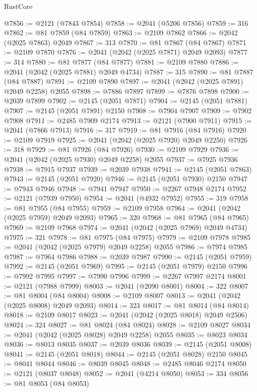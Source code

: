 \begin{lexlean}{RustCore}
\begin{coremodule}
@7856 := @2121 (@7843 @7854)
@7858 := @2041 (@5206 @7856)
@7859 := 316
@7862 := @81 @7859 (@84 @7859)
@7863 := @2109 @7862
@7866 := @2042 (@2025 @7863) @2049
@7867 := 313
@7870 := @81 @7867 (@84 @7867)
@7871 := @2109 @7870
@7876 := @2041 (@2042 (@2025 @7871) @2049 @2093)
@7877 := 314
@7880 := @81 @7877 (@84 @7877)
@7881 := @2109 @7880
@7886 := @2041 (@2042 (@2025 @7881) @2049 @4734)
@7887 := 315
@7890 := @81 @7887 (@84 @7887)
@7891 := @2109 @7890
@7897 := @2041 (@2042 (@2025 @7891) @2049 @2258) @2055
@7898 := @7886 @7897
@7899 := @7876 @7898
@7900 := @2039 @7899
@7902 := @2145 (@2051 @7871)
@7904 := @2145 (@2051 @7881)
@7907 := @2145 (@2051 @7891) @2150
@7908 := @7904 @7907
@7909 := @7902 @7908
@7911 := @2485 @7909 @2174
@7913 := @2121 (@7900 @7911)
@7915 := @2041 (@7866 @7913)
@7916 := 317
@7919 := @81 @7916 (@84 @7916)
@7920 := @2109 @7919
@7925 := @2041 (@2042 (@2025 @7920) @2049 @2250)
@7926 := 318
@7929 := @81 @7926 (@84 @7926)
@7930 := @2109 @7929
@7936 := @2041 (@2042 (@2025 @7930) @2049 @2258) @2055
@7937 := @7925 @7936
@7938 := @7915 @7937
@7939 := @2039 @7938
@7941 := @2145 (@2051 @7863)
@7943 := @2145 (@2051 @7920)
@7946 := @2145 (@2051 @7930) @2150
@7947 := @7943 @7946
@7948 := @7941 @7947
@7950 := @2267 @7948 @2174
@7952 := @2121 (@7939 @7950)
@7954 := @2041 (@4932 @7952)
@7955 := 319
@7958 := @81 @7955 (@84 @7955)
@7959 := @2109 @7958
@7964 := @2041 (@2042 (@2025 @7959) @2049 @2093)
@7965 := 320
@7968 := @81 @7965 (@84 @7965)
@7969 := @2109 @7968
@7974 := @2041 (@2042 (@2025 @7969) @2049 @4734)
@7975 := 321
@7978 := @81 @7975 (@84 @7975)
@7979 := @2109 @7978
@7985 := @2041 (@2042 (@2025 @7979) @2049 @2258) @2055
@7986 := @7974 @7985
@7987 := @7964 @7986
@7988 := @2039 @7987
@7990 := @2145 (@2051 @7959)
@7992 := @2145 (@2051 @7969)
@7995 := @2145 (@2051 @7979) @2150
@7996 := @7992 @7995
@7997 := @7990 @7996
@7999 := @2267 @7997 @2174
@8001 := @2121 (@7988 @7999)
@8003 := @2041 (@2090 @8001)
@8004 := 322
@8007 := @81 @8004 (@84 @8004)
@8008 := @2109 @8007
@8013 := @2041 (@2042 (@2025 @8008) @2049 @2093)
@8014 := 323
@8017 := @81 @8014 (@84 @8014)
@8018 := @2109 @8017
@8023 := @2041 (@2042 (@2025 @8018) @2049 @2506)
@8024 := 324
@8027 := @81 @8024 (@84 @8024)
@8028 := @2109 @8027
@8034 := @2041 (@2042 (@2025 @8028) @2049 @2258) @2055
@8035 := @8023 @8034
@8036 := @8013 @8035
@8037 := @2039 @8036
@8039 := @2145 (@2051 @8008)
@8041 := @2145 (@2051 @8018)
@8044 := @2145 (@2051 @8028) @2150
@8045 := @8041 @8044
@8046 := @8039 @8045
@8048 := @2485 @8046 @2174
@8050 := @2121 (@8037 @8048)
@8052 := @2041 (@4214 @8050)
@8053 := 334
@8056 := @81 @8053 (@84 @8053)

\end{coremodule}
\end{lexlean}
